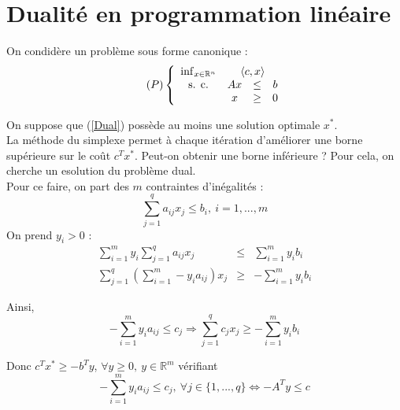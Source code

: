 \section{Dualité en programmation linéaire}
On condidère un problème sous forme canonique :
\begin{equation}\tag{$P$} \label{Dual}
	\left\{ \begin{array}{c c c c} \inf_{x\in\mathbb{R}^n} & \multicolumn{3}{c}{\langle c,x\rangle} \\
						\text{s. c.}     & Ax &\leq& b \\
								& x &\geq& 0
	\end{array} \right.
\end{equation}

On suppose que (\ref{Dual}) possède au moins une solution optimale $x^*$. \\
La méthode du simplexe permet à chaque itération d'améliorer une borne supérieure sur le coût $c^Tx^*$. Peut-on obtenir une borne inférieure ? Pour cela, on cherche un esolution du problème dual.\\
Pour ce faire, on part des $m$ contraintes d'inégalités :
	\[\sum_{j=1}^q a_{ij}x_j\leq b_i,\ i=1,...,m\]
On prend $y_i>0$ : 
\begin{eqnarray*}
	\sum_{i=1}^m y_i \sum_{j=1}^q a_{ij}x_j&\leq& \sum_{i=1}^m y_ib_i\\
	\sum_{j=1}^q \left( \sum_{i=1}^m -y_ia_{ij}\right) x_j&\geq& -\sum_{i=1}^m y_ib_i
\end{eqnarray*}

Ainsi, \[-\sum_{i=1}^m y_ia_{ij} \leq c_j \Rightarrow \sum_{j=1}^q c_jx_j \geq -\sum_{i=1}^m y_ib_i\]

Donc $c^Tx^*\geq -b^Ty$, $\forall y\geq 0,\ y\in\mathbb{R}^m$ vérifiant \[-\sum_{i=1}^m y_ia_{ij} \leq c_j,\ \forall j\in\{1,...,q\}\Leftrightarrow -A^Ty\leq c\]



